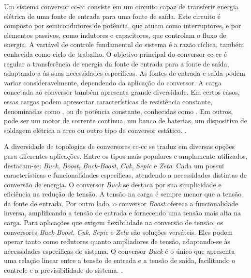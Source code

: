 Um sistema conversor \acrshort{cc}-\acrshort{cc} consiste em um circuito capaz de transferir energia elétrica de uma fonte de entrada para uma fonte de saída. Este circuito é composto por semicondutores de potência, que atuam como interruptores, e por elementos passivos, como indutores e capacitores, que controlam o fluxo de energia. A variável de controle fundamental do sistema é a razão cíclica, também conhecida como ciclo de trabalho. O objetivo principal do conversor \acrshort{cc}-\acrshort{cc} é regular a transferência de energia da fonte de entrada para a fonte de saída, adaptando-a às suas necessidades específicas. As fontes de entrada e saída podem variar consideravelmente, dependendo da aplicação do conversor. A carga conectada ao conversor também apresenta grande diversidade. Em certos casos, essas cargas podem apresentar características de resistência constante, denominadas como , ou de potência constante, conhecidas como . Em outros, pode ser um motor de corrente contínua, um banco de baterias, um dispositivo de soldagem elétrica a arco ou outro tipo de conversor estático. \citep{martins2008}.


A diversidade de topologias de conversores \acrshort{cc}-\acrshort{cc} se traduz em diversas opções para diferentes aplicações. Entre os tipos mais populares e amplamente utilizados, destacam-se: \textit{Buck}, \textit{Boost}, \textit{Buck-\textit{Boost}}, \textit{Cuk}, \textit{Sepic} e \textit{Zeta}. Cada um possui características e funcionalidades específicas, atendendo a necessidades distintas de conversão de energia. O conversor \textit{Buck} se destaca por sua simplicidade e eficiência na redução de tensão. A tensão na carga é sempre menor que a tensão da fonte de entrada. Por outro lado, o conversor \textit{Boost} oferece a funcionalidade inversa, amplificando a tensão de entrada e fornecendo uma tensão mais alta na carga. Para aplicações que exigem flexibilidade na conversão de tensão, os conversores \textit{Buck}-\textit{Boost}, \textit{Cuk}, \textit{Sepic} e \textit{Zeta} são soluções versáteis. Eles podem operar tanto como redutores quanto ampliadores de tensão, adaptando-se às necessidades específicas do sistema. O conversor \textit{Buck} é o único que apresenta uma relação linear entre a tensão de entrada e a tensão de saída, facilitando o controle e a previsibilidade do sistema. \citep{martins2008}.

